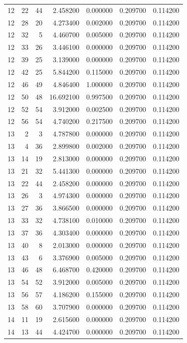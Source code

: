 \begin{table}
\begin{tabular}{rrrrrrr}
12 & 22 & 44 & 2.458200 & 0.000000 & 0.209700 & 0.114200 \\
12 & 28 & 20 & 4.273400 & 0.002000 & 0.209700 & 0.114200 \\
12 & 32 & 5 & 4.460700 & 0.005000 & 0.209700 & 0.114200 \\
12 & 33 & 26 & 3.446100 & 0.000000 & 0.209700 & 0.114200 \\
12 & 39 & 25 & 3.139000 & 0.000000 & 0.209700 & 0.114200 \\
12 & 42 & 25 & 5.844200 & 0.115000 & 0.209700 & 0.114200 \\
12 & 46 & 49 & 4.846400 & 1.000000 & 0.209700 & 0.114200 \\
12 & 50 & 48 & 16.692100 & 0.997500 & 0.209700 & 0.114200 \\
12 & 52 & 54 & 3.912000 & 0.002500 & 0.209700 & 0.114200 \\
12 & 56 & 54 & 4.740200 & 0.217500 & 0.209700 & 0.114200 \\
13 & 2 & 3 & 4.787800 & 0.000000 & 0.209700 & 0.114200 \\
13 & 4 & 36 & 2.899800 & 0.002000 & 0.209700 & 0.114200 \\
13 & 14 & 19 & 2.813000 & 0.000000 & 0.209700 & 0.114200 \\
13 & 21 & 32 & 5.441300 & 0.000000 & 0.209700 & 0.114200 \\
13 & 22 & 44 & 2.458200 & 0.000000 & 0.209700 & 0.114200 \\
13 & 26 & 3 & 4.974300 & 0.000000 & 0.209700 & 0.114200 \\
13 & 27 & 36 & 3.866500 & 0.000000 & 0.209700 & 0.114200 \\
13 & 33 & 32 & 4.738100 & 0.010000 & 0.209700 & 0.114200 \\
13 & 37 & 36 & 4.303400 & 0.000000 & 0.209700 & 0.114200 \\
13 & 40 & 8 & 2.013000 & 0.000000 & 0.209700 & 0.114200 \\
13 & 43 & 6 & 3.376900 & 0.005000 & 0.209700 & 0.114200 \\
13 & 46 & 48 & 6.468700 & 0.420000 & 0.209700 & 0.114200 \\
13 & 54 & 52 & 3.912000 & 0.005000 & 0.209700 & 0.114200 \\
13 & 56 & 57 & 4.186200 & 0.155000 & 0.209700 & 0.114200 \\
13 & 58 & 60 & 3.707900 & 0.000000 & 0.209700 & 0.114200 \\
14 & 11 & 19 & 2.615600 & 0.000000 & 0.209700 & 0.114200 \\
14 & 13 & 44 & 4.424700 & 0.000000 & 0.209700 & 0.114200 \\

\end{tabular}
\end{table}
